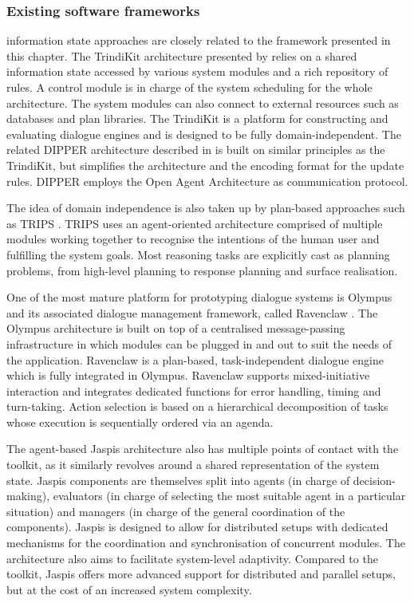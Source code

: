 \subsubsection*{Existing software frameworks}

information state approaches are closely related to the framework presented in this chapter. The TrindiKit architecture presented by \cite{Larsson:2000} relies on a shared information state accessed by various system modules and a rich repository of rules. A control module is in charge of the system scheduling for the whole architecture. The system modules can also connect to external resources such as databases and plan libraries.   The TrindiKit is a platform for constructing and evaluating dialogue engines and is designed to be fully domain-independent. The related DIPPER architecture described in \cite{Bos2003} is built on similar principles as the TrindiKit, but simplifies the architecture and the encoding format for the  update rules.  DIPPER employs the Open Agent Architecture as communication protocol.

The idea of domain independence is also taken up by plan-based approaches such as TRIPS \citep[The Rochester Interactive Planning System, cf. ][]{Allen:2000:AGD:973935.973937}. TRIPS uses an agent-oriented architecture comprised of multiple modules working together to recognise the intentions of the human user and fulfilling the system goals.  Most reasoning tasks are explicitly cast as planning problems, from high-level planning to response planning and surface realisation.  

One of the most mature platform for prototyping dialogue systems is Olympus and its associated dialogue management framework, called Ravenclaw \citep{Bohus:2007,Bohus:2009}.  The Olympus architecture is built on top of a centralised message-passing infrastructure in which modules can be plugged in and out to suit the needs of the application.  Ravenclaw is a plan-based, task-independent dialogue engine which is fully integrated in Olympus.  Ravenclaw supports mixed-initiative interaction and integrates dedicated functions for error handling, timing and turn-taking. Action selection is based on a hierarchical decomposition of tasks whose execution is sequentially ordered via an agenda. 

The agent-based Jaspis architecture \citep{jaspis2004} also has multiple points of contact with the \opendial{} toolkit, as it similarly revolves around a shared representation of the system state.  Jaspis components are themselves split into agents (in charge of decision-making), evaluators (in charge of selecting the most suitable agent in a particular situation) and managers (in charge of the general coordination of the components). Jaspis is designed to allow for distributed setups with dedicated mechanisms for the coordination and synchronisation of concurrent modules.  The architecture also aims to facilitate system-level adaptivity.  Compared to the \opendial{} toolkit, Jaspis offers more advanced support for distributed and parallel setups, but at the cost of an increased system complexity.  

